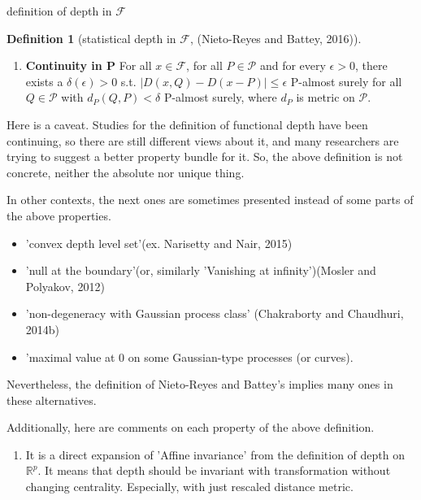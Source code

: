 \documentclass[aspectratio=169,ignorenonframetext,9pt]{beamer}
\theoremstyle{plain}
\theoremstyle{definition}
\newtheorem{defn}{Definition}[section]
\begin{document}
\begin{frame}{definition of depth in $\mathcal{F}$}
\begin{defn}[statistical depth in $\mathcal{F}$, (Nieto-Reyes and Battey, 2016)]
\begin{enumerate}
            Then, $D$ has a property that $D(x,P_X)<D(f(x),P_{f(X)})$ for any $x\in C(\mathcal{F},P)$
            with $D(x,P)<sup_{y\in\mathcal{F}}D(y,P)$ and $f:\mathcal{F}\rightarrow\mathcal{F}$
            s.t. $f(y(v))=\alpha(v)y(v)$ with $\alpha(v)\in(0,1)$ for all $v\in L_{\delta}$ and $\alpha(v)=1$ otherwise,
            where \(L_\delta = argsup_{H\in V} \{sup_{x,y\in C(\mathcal{F},P)} d(x(H),y(H)) \leq \delta\}\)
            for any $\delta\in inf_{v\in V}d(L(v),U(v)), d(L,U)$ s.t. $\lambda(L_\delta)>0$ and $\lambda(L_\delta^c)>0$.
        \item \textbf{Continuity in P}
            For all $x\in\mathcal{F}$, for all $P \in \mathcal{P}$ and for every $\epsilon>0$,
            there exists a $\delta(\epsilon)>0$ s.t. $|D(x,Q)-D(x-P)|\leq\epsilon$ P-almost surely for all $Q\in\mathcal{P}$ with
            $d_P(Q,P)<\delta$ P-almost surely, where $d_P$ is metric on $\mathcal{P}$.
        \end{enumerate}
    \end{defn}

Here is a caveat. Studies for the definition of functional depth have been continuing, so
there are still different views about it, and many researchers are trying to
suggest a better property bundle for it. So, the above definition is not concrete, neither the absolute nor unique thing.
    
    
In other contexts, the next ones are sometimes presented instead of some parts of the above properties.
\begin{itemize}
    \item 'convex depth level set'(ex. Narisetty and Nair, 2015)
    \item 'null at the boundary'(or, similarly 'Vanishing at infinity')(Mosler and Polyakov, 2012)
    \item 'non-degeneracy with Gaussian process class' (Chakraborty and Chaudhuri, 2014b)
    \item 'maximal value at 0 on some Gaussian-type processes (or curves).
\end{itemize}
Nevertheless, the definition of Nieto-Reyes and Battey's implies many ones in these alternatives.

Additionally, here are comments on each property of the above definition.
\begin{enumerate}
    \item It is a direct expansion of 'Affine invariance' from the definition of depth on $\mathbb{R}^p$.
    It means that depth should be invariant with transformation without changing centrality.
    Especially, with just rescaled distance metric.
    

\end{enumerate}
\end{frame}
\end{document}
